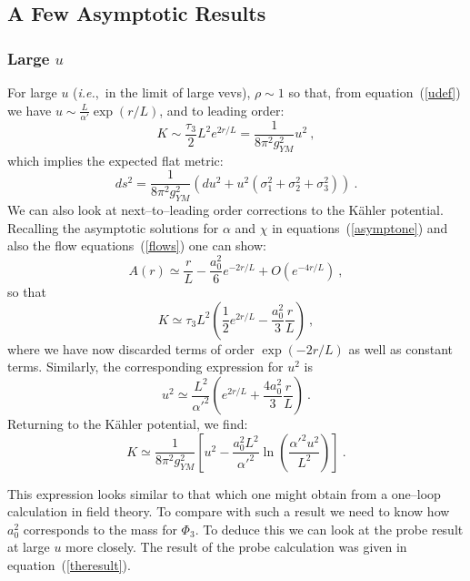\documentclass[a4paper,12pt]{article}
\newcommand{\reef}[1]{(\ref{#1})}
\begin{document}
\subsection{A Few Asymptotic Results}

\subsubsection{Large $u$}
\label{sec:largeu}

For large $u$ ({\it i.e.},~in the limit of large vevs), $\rho \sim 1$
so that, from equation~\reef{udef} we have $u \sim \frac{L}{\alpha'}
\exp(r/L)$, and to leading order:
\begin{equation}
  K \sim \frac{\tau_3}{2} L^2 e^{2r/L} = \frac{1}{8 \pi^2 g_{YM}^2} u^2\ ,
\end{equation}
%
which implies the expected flat metric:
\begin{equation}
  ds^2 = \frac{1}{8 \pi^2 g_{YM}^2} (du^2 + u^2 (\sigma_1^2 + \sigma_2^2 + \sigma_3^2))\ .
\end{equation}
%
We can also look at next--to--leading order corrections to the
K\"ahler potential.  Recalling the asymptotic solutions for $\alpha$
and $\chi$ in equations~\reef{asymptone} and also the flow
equations~\reef{flows} one can show:
\begin{equation}
  A(r) \simeq \frac{r}{L} - \frac{a_0^2}{6} e^{-2r/L} + O(e^{-4r/L})\ ,
\end{equation}
so that
\begin{equation}
  K \simeq \tau_3 L^2 \left(\frac{1}{2} e^{2r/L} - \frac{a_0^2}{3} \frac{r}{L} \right) \ ,
\end{equation}
where we have now discarded terms of order $\exp(-2r/L)$ as well as
constant terms.  Similarly, the corresponding expression for $u^2$ is
\begin{equation}
  u^2 \simeq \frac{L^2}{{\alpha'}^2} \left(e^{2r/L} + \frac{4 a_0^2}{3} \frac{r}{L} \right)\ .
\end{equation}
%
Returning to the K\"ahler potential, we find:
\begin{equation}
  K \simeq \frac{1}{8 \pi^2 g_{YM}^2} \left[u^2 - \frac{a_0^2 L^2}{{\alpha'}^2} \ln\left(\frac{{\alpha'}^2 u^2}{L^2}\right)\right]\ .
\end{equation}

This expression looks similar to that which one might obtain from a
one--loop calculation in field theory. To compare with such a result
we need to know how $a_0^2$ corresponds to the mass for $\Phi_3$.  To
deduce this we can look at the probe result at large $u$ more closely.
The result of the probe calculation was given in
equation~\reef{theresult}.
\end{document}
